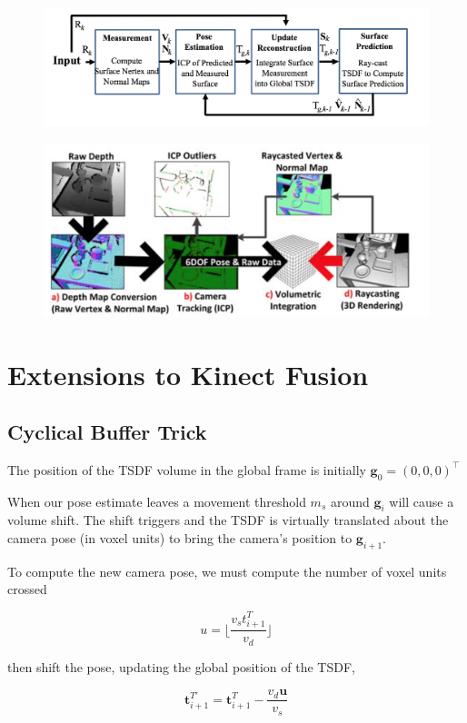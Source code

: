 \documentclass[10pt,twocolumn]{article}
\begin{document}
\begin{figure}
\includegraphics[width=0.8\linewidth]{workflow}
\end{figure}

\begin{figure}
\includegraphics[width=0.8\linewidth]{kinectfusion}
\end{figure}




\section{Extensions to Kinect Fusion}

\subsection{Cyclical Buffer Trick}
The position of the TSDF volume in the global frame is initially $\mathbf{g}_{0} = (0, 0, 0)^{\top}$

When our pose estimate leaves a movement threshold $m_{s}$ around $\mathbf{g}_{i}$ will cause a volume shift.
The shift triggers and the TSDF is virtually translated about the camera pose (in voxel units) to bring the camera's position to $\mathbf{g}_{i+1}$.


To compute the new camera pose, we must compute the number of voxel units crossed

$$
u = \lfloor \frac{v_{s}t^{T}_{i+1}}{v_d} \rfloor
$$

then shift the pose, updating the global position of the TSDF,

$$
\mathbf{t}^{T'}_{i+1} = \mathbf{t}^{T}_{i+1} - \frac{v_{d}\mathbf{u}}{v_{s}}
$$
\end{document}
